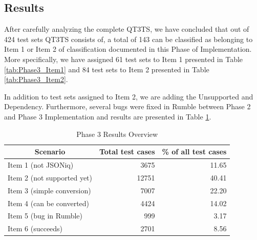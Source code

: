 \subsection{Results}
After carefully analyzing the complete QT3TS, we have concluded that out of 424 test sets QT3TS consists of, a total of 143 can be classified as belonging to Item 1 or Item 2 of classification documented in this Phase of Implementation. More specifically, we have assigned 61 test sets to Item 1 presented in Table \ref{tab:Phase3_Item1} and 84 test sets to Item 2 presented in Table \ref{tab:Phase3_Item2}.

In addition to test sets assigned to Item 2, we are adding the Unsupported and Dependency. Furthermore, several bugs were fixed in Rumble between Phase 2 and Phase 3 Implementation and results are presented in Table \ref{tab:Phase3_ResultTable}.
\begin{table}[h!]
	\centering
	\begin{tabular}{|l|r|r|}
		\hline
		\multicolumn{1}{|c|}{Scenario} & \multicolumn{1}{c|}{Total test cases} & \multicolumn{1}{c|}{\% of all test cases} \\ \hline
		Item 1 (not JSONiq)                        & 3675                                  & 11.65                                     \\ \hline
		Item 2 (not supported yet)                        & 12751                                 & 40.41                                     \\ \hline
		Item 3 (simple conversion)                        & 7007                                  & 22.20                                     \\ \hline
		Item 4 (can be converted)                        & 4424                                  & 14.02                                     \\ \hline
		Item 5 (bug in Rumble)                         & 999                                   & 3.17                                      \\ \hline
		Item 6 (succeeds)                        & 2701                                  & 8.56                                      \\ \hline
	\end{tabular}
	\caption{Phase 3 Results Overview}
	\label{tab:Phase3_ResultTable}
\end{table}


